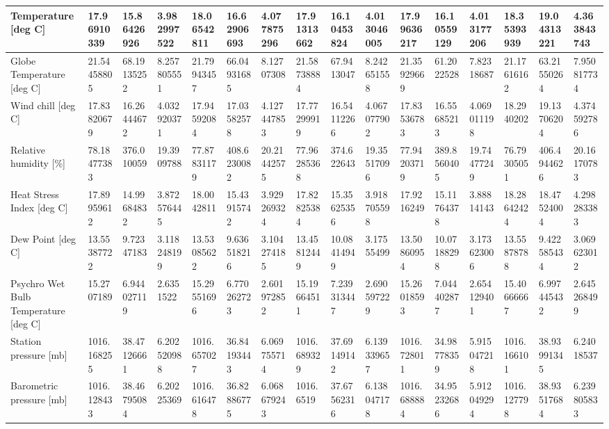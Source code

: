 \documentclass[a4paper,12pt]{article} %
\begin{document}
\begin{enumerate}
\begin{table}[H]
{\begin{tabular}{|l|l|l|l|l|l|l|l|l|l|l|l|l|l|l|l|}
Temperature {[}deg C{]}                         & 17.96910339  & 15.86426926 & 3.982997522 & 18.06542811  & 16.62906693 & 4.077875296 & 17.91313662  & 16.10453824 & 4.013046005 & 17.99636217  & 16.10559129 & 4.013177206 & 18.35393939  & 19.04313221 & 4.363843743 \\ \hline
Globe Temperature {[}deg C{]}                   & 21.54458805  & 68.19135252 & 8.257805551 & 21.79943457  & 66.04931685 & 8.12707308  & 21.58738884  & 67.9413047  & 8.242651558 & 21.35929669  & 61.2022528  & 7.82318687  & 21.17616162  & 63.21550264 & 7.950817734 \\ \hline
Wind chill {[}deg C{]}                          & 17.83820679  & 16.26444672 & 4.032920371 & 17.94592084  & 17.03582578 & 4.127447853 & 17.77299919  & 16.54112266 & 4.067077902 & 17.83536783  & 16.55685213 & 4.069011198 & 18.2940202   & 19.13706204 & 4.374592786 \\ \hline
Relative humidity {[}\%{]}                      & 78.18477383  & 376.010059  & 19.3909788  & 77.87831179  & 408.6230082 & 20.21442575 & 77.96285368  & 374.622643  & 19.35517096 & 77.94203719  & 389.8560405 & 19.74477249 & 76.79305051  & 406.4944626 & 20.16170783 \\ \hline
Heat Stress Index {[}deg C{]}                   & 17.89959612  & 14.99684832 & 3.872576445 & 18.0042811   & 15.43915742 & 3.929269324 & 17.82825384  & 15.35625356 & 3.918705598 & 17.9216249   & 15.11764378 & 3.88814143  & 18.28642424  & 18.47524004 & 4.298283383 \\ \hline
Dew Point {[}deg C{]}                           & 13.55387722  & 9.72347183  & 3.118248199 & 13.53085622  & 9.636518216 & 3.104274185 & 13.45812449  & 10.08414949 & 3.17555499  & 13.50860954  & 10.07188298 & 3.173623006 & 13.55878788  & 9.422585434 & 3.069623012 \\ \hline
Psychro Wet Bulb Temperature {[}deg C{]}        & 15.2707189   & 6.944027119 & 2.6351522   & 15.29551696  & 6.770262723 & 2.601972852 & 15.19664511  & 7.239313447 & 2.690597229 & 15.26018593  & 7.044402877 & 2.654129401 & 15.40666667  & 6.997445432 & 2.645268499 \\ \hline
Station pressure {[}mb{]}                       & 1016.168255  & 38.47126661 & 6.202520988 & 1016.657027  & 36.84193443 & 6.069755714 & 1016.689329  & 37.69149142 & 6.139339657 & 1016.728011  & 34.98778359 & 5.915047218 & 1016.166101  & 38.93991345 & 6.24018537  \\ \hline
Barometric pressure {[}mb{]}                    & 1016.128433  & 38.46795084 & 6.20225369  & 1016.616478  & 36.82886775 & 6.068679243 & 1016.6519    & 37.67562316 & 6.138047178 & 1016.688884  & 34.95232686 & 5.912049294 & 1016.127798  & 38.93517684 & 6.239805833 \\ \hline

\end{tabular}}
\end{table}
\end{enumerate}
\end{document}
